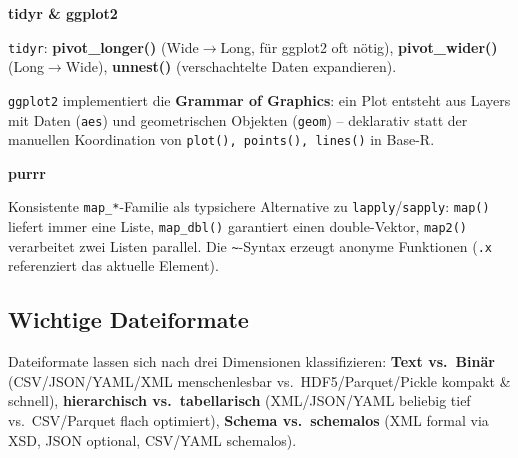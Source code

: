 \textbf{tidyr \& ggplot2}

\texttt{tidyr}: \textbf{pivot\_longer()} (Wide$\to$Long, für ggplot2 oft nötig), \textbf{pivot\_wider()} (Long$\to$Wide), \textbf{unnest()} (verschachtelte Daten expandieren).

\texttt{ggplot2} implementiert die \textbf{Grammar of Graphics}: ein Plot entsteht aus Layers mit Daten (\texttt{aes}) und geometrischen Objekten (\texttt{geom}) -- deklarativ statt der manuellen Koordination von \texttt{plot(), points(), lines()} in Base-R.

\textbf{purrr}

Konsistente \texttt{map\_*}-Familie als typsichere Alternative zu \texttt{lapply}/\texttt{sapply}: \texttt{map()} liefert immer eine Liste, \texttt{map\_dbl()} garantiert einen double-Vektor, \texttt{map2()} verarbeitet zwei Listen parallel. Die \texttt{\textasciitilde}-Syntax erzeugt anonyme Funktionen (\texttt{.x} referenziert das aktuelle Element).

\newpage

\subsection{Wichtige Dateiformate}

Dateiformate lassen sich nach drei Dimensionen klassifizieren: \textbf{Text vs.\ Binär} (CSV/JSON/YAML/XML menschenlesbar vs.\ HDF5/Parquet/Pickle kompakt \& schnell), \textbf{hierarchisch vs.\ tabellarisch} (XML/JSON/YAML beliebig tief vs.\ CSV/Parquet flach optimiert), \textbf{Schema vs.\ schemalos} (XML formal via XSD, JSON optional, CSV/YAML schemalos).

